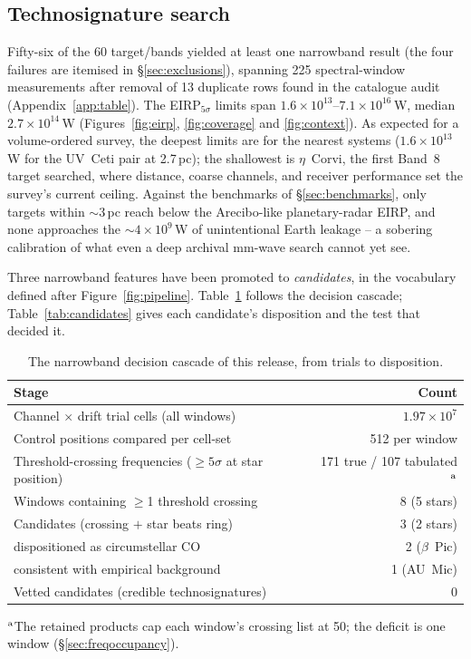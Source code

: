\documentclass{openjournal}
\begin{document}
\subsection{Technosignature search}
\label{sec:technosearch}

Fifty-six of the 60 target/bands yielded at least one narrowband
result (the four failures are itemised in \S\ref{sec:exclusions}),
spanning 225 spectral-window measurements after removal of 13
duplicate rows found in the catalogue audit
(Appendix~\ref{app:table}). The EIRP$_{5\sigma}$ limits span
$1.6\times10^{13}$--$7.1\times10^{16}$\,W, median
$2.7\times10^{14}$\,W (Figures~\ref{fig:eirp}, \ref{fig:coverage} and
\ref{fig:context}). As expected for a volume-ordered survey, the
deepest limits are for the nearest systems ($1.6\times10^{13}$\,W for
the UV~Ceti pair at 2.7\,pc); the shallowest is $\eta$~Corvi, the
first Band~8 target searched, where distance, coarse channels, and
receiver performance set the survey's current ceiling. Against the
benchmarks of \S\ref{sec:benchmarks}, only targets within
$\sim$3\,pc reach below the Arecibo-like planetary-radar EIRP, and
none approaches the $\sim4\times10^{9}$\,W of unintentional Earth
leakage -- a sobering calibration of what even a deep archival
mm-wave search cannot yet see.

Three narrowband features have been promoted to \emph{candidates}, in
the vocabulary defined after Figure~\ref{fig:pipeline}.
Table~\ref{tab:funnel} follows the decision cascade;
Table~\ref{tab:candidates} gives each candidate's disposition and the
test that decided it.

\begin{table}
\centering
\small
\caption{The narrowband decision cascade of this release, from trials
to disposition.}
\label{tab:funnel}
\begin{tabular}{@{}lr@{}}
\hline
Stage & Count \\
\hline
Channel $\times$ drift trial cells (all windows) & $1.97\times10^{7}$ \\
Control positions compared per cell-set & 512 per window \\
Threshold-crossing frequencies ($\geq5\sigma$ at star position) & 171 true / 107 tabulated$^{\rm a}$ \\
Windows containing $\geq$1 threshold crossing & 8 (5 stars) \\
Candidates (crossing $+$ star beats ring) & 3 (2 stars) \\
\quad dispositioned as circumstellar CO & 2 ($\beta$~Pic) \\
\quad consistent with empirical background & 1 (AU~Mic) \\
Vetted candidates (credible technosignatures) & 0 \\
\hline
\end{tabular}
\parbox{\columnwidth}{\footnotesize $^{\rm a}$The retained products cap
each window's crossing list at 50; the deficit is one window
(\S\ref{sec:freqoccupancy}).}
\end{table}
\end{document}
